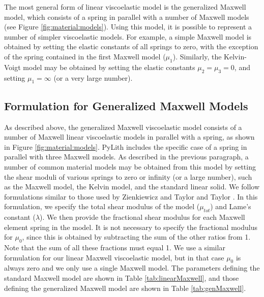 The most general form of linear viscoelastic model is the generalized
Maxwell model, which consists of a spring in parallel with a number
of Maxwell models (see Figure \vref{fig:material:models}). Using this
model, it is possible to represent a number of simpler viscoelastic
models. For example, a simple Maxwell model is obtained by setting
the elastic constants of all springs to zero, with the exception of
the spring contained in the first Maxwell model ($\mu_{1}$). Similarly,
the Kelvin-Voigt model may be obtained by setting the elastic constants
$\mu_{2}=\mu_{3}=0$, and setting $\mu_{1}=\infty$ (or a very large
number).


\subsection{Formulation for Generalized Maxwell Models\label{sub:Formulation-for-Gen-Max}}

As described above, the generalized Maxwell viscoelastic model consists
of a number of Maxwell linear viscoelastic models in parallel with
a spring, as shown in Figure \vref{fig:material:models}. PyLith includes
the specific case of a spring in parallel with three Maxwell models.
As described in the previous paragraph, a number of common material
models may be obtained from this model by setting the shear moduli
of various springs to zero or infinity (or a large number), such as
the Maxwell model, the Kelvin model, and the standard linear solid.
We follow formulations similar to those used by Zienkiewicz and Taylor
\cite{Zienkiewicz:Taylor:2000} and Taylor \cite{Taylor:2003}. In
this formulation, we specify the total shear modulus of the model
($\mu_{tot}$) and Lame's constant ($\lambda$). We then provide the
fractional shear modulus for each Maxwell element spring in the model.
It is not necessary to specify the fractional modulus for $\mu_{0}$,
since this is obtained by subtracting the sum of the other ratios
from 1. Note that the sum of all these fractions must equal 1. We
use a similar formulation for our linear Maxwell viscoelastic model,
but in that case $\mu_{0}$ is always zero and we only use a single
Maxwell model. The parameters defining the standard Maxwell model
are shown in Table \vref{tab:linearMaxwell}, and those defining the
generalized Maxwell model are shown in Table \vref{tab:genMaxwell}.

